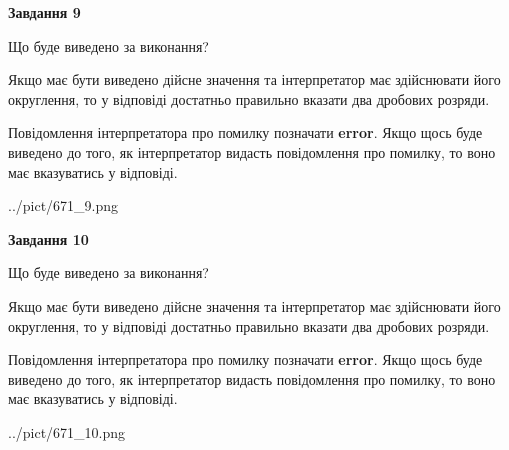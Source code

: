 \documentclass[12pt, ukrainian]{article}
\begin{document}
{\begin {Large}
{\begin {center}\textbf{Завдання 9}\end {center}}\par
Що буде виведено за виконання? \par

Якщо має бути виведено дійсне значення та інтерпретатор має здійснювати його округлення, 
то у відповіді достатньо правильно вказати два дробових розряди.

Повідомлення інтерпретатора про помилку позначати \textbf{error}.
Якщо щось буде виведено до того, як інтерпретатор видасть повідомлення про помилку, 
то воно має вказуватись у відповіді. \par

\begin{center}
	{../pict/671_9.png}
\end{center}
\newpage

{\begin {center}\textbf{Завдання 10}\end {center}}\par
Що буде виведено за виконання? \par

Якщо має бути виведено дійсне значення та інтерпретатор має здійснювати його округлення, 
то у відповіді достатньо правильно вказати два дробових розряди.

Повідомлення інтерпретатора про помилку позначати \textbf{error}.
Якщо щось буде виведено до того, як інтерпретатор видасть повідомлення про помилку, 
то воно має вказуватись у відповіді. \par

\begin{center}
	{../pict/671_10.png}
\end{center}
\newpage

\end {Large}}
\end{document}
